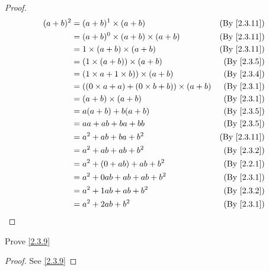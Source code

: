 \begin{proof}
  \begin{align*}
    (a + b)^2 & = (a + b)^1 \times (a + b)                             & \text{(By \cref{2.3.11})} \\
              & = (a + b)^0 \times (a + b) \times (a + b)              & \text{(By \cref{2.3.11})} \\
              & = 1 \times (a + b) \times (a + b)                      & \text{(By \cref{2.3.11})} \\
              & = (1 \times (a + b)) \times (a + b)                    & \text{(By \cref{2.3.5})}  \\
              & = (1 \times a + 1 \times b)) \times (a + b)            & \text{(By \cref{2.3.4})}  \\
              & = ((0 \times a + a) + (0 \times b + b)) \times (a + b) & \text{(By \cref{2.3.1})}  \\
              & = (a + b) \times (a + b)                               & \text{(By \cref{2.3.1})}  \\
              & = a(a + b) + b(a + b)                                  & \text{(By \cref{2.3.5})}  \\
              & = aa + ab + ba + bb                                    & \text{(By \cref{2.3.5})}  \\
              & = a^2 + ab + ba + b^2                                  & \text{(By \cref{2.3.11})} \\
              & = a^2 + ab + ab + b^2                                  & \text{(By \cref{2.3.2})}  \\
              & = a^2 + (0 + ab) + ab + b^2                            & \text{(By \cref{2.2.1})}  \\
              & = a^2 + 0ab + ab + ab + b^2                            & \text{(By \cref{2.3.1})}  \\
              & = a^2 + 1ab + ab + b^2                                 & \text{(By \cref{2.3.2})}  \\
              & = a^2 + 2ab + b^2                                      & \text{(By \cref{2.3.1})}  \\
  \end{align*}
\end{proof}

\begin{ex}\label{ex:2.3.5}
  Prove \cref{2.3.9}
\end{ex}

\begin{proof}
  See \cref{2.3.9}
\end{proof}